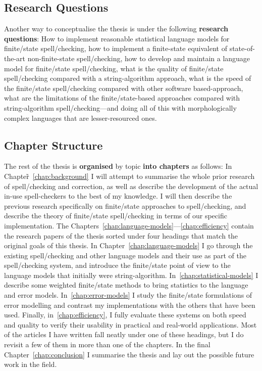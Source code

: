 \documentclass[officiallayout,final]{unihelcompling}
\begin{document}
\subsection{Research Questions}
\label{subsec:questions}

Another way to conceptualise the thesis is under the following \textbf{research
questions}: How to implement reasonable statistical language models for
finite\-/state spell\-/checking, how to implement a finite-state equivalent of
state-of-the-art non-finite-state spell\-/checking, how to develop and maintain
a language model for finite\-/state spell\-/checking, what is the quality of
finite\-/state spell\-/checking compared with a string-algorithm approach, what
is the speed of the finite\-/state spell\-/checking compared with other
software based-approach, what are the limitations of the finite\-/state-based
approaches compared with string-algorithm spell\-/checking---and doing all of
this with morphologically complex languages that are lesser-resourced ones.

\subsection{Chapter Structure}

The rest of the thesis is \textbf{organised} by topic \textbf{into chapters} as
follows: In Chapter̃~\ref{chap:background} I will attempt to summarise the whole
prior research of spell\-/checking and correction, as well as describe the
development of the actual in-use spell-checkers to the best of my knowledge. I
will then describe the previous research specifically on finite\-/state
approaches to spell\-/checking, and describe the theory of finite\-/state
spell\-/checking in terms of our specific implementation. The
Chapters~\ref{chap:language-models}---\ref{chap:efficiency} contain the
research papers of the thesis sorted under four headings that match the
original goals of this thesis.  In Chapter~\ref{chap:language-models} I go
through the existing spell\-/checking and other language models and their use
as part of the spell\-/checking system, and introduce the finite\-/state point
of view to the language models that initially were string-algorithm.
In~\ref{chap:statistical-models} I describe some weighted finite\-/state
methods to bring statistics to the language and error models.
In~\ref{chap:error-models} I study the finite\-/state formulations of error
modelling and contrast my implementations with the others that have been used.
Finally, in~\ref{chap:efficiency}, I fully evaluate these systems on both speed
and quality to verify their usability in practical and real-world applications.
Most of the articles I have written fall neatly under one of these headings,
but I do revisit a few of them in more than one of the chapters. In the final
Chapter~\ref{chap:conclusion} I summarise the thesis and lay out the possible
future work in the field.
\end{document}
